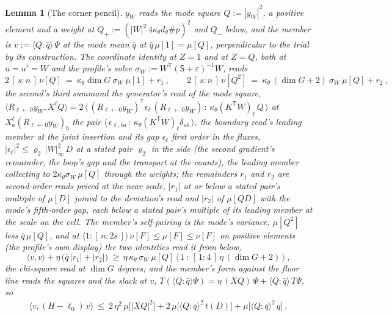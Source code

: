 \documentclass[11pt]{article}
\newtheorem{lemma}{Lemma}
\theoremstyle{definition}
\begin{document}
\begin{lemma}[The corner pencil]
$y_W$ reads the \emph{mode square} $Q:=|y_W|^{2}$, a positive
element and a weight at $Q_+:=(|W|^{2}\,4\kappa_\theta d_\theta\#p)^{2}$
and $Q_-$ below, and the member is
$v:=\langle Q\!:\!\bar q\rangle\,\Psi$ at the \emph{mode mean} $\bar q$ at
$\bar q\,\mu[1]=\mu[Q]$, perpendicular to the trial by its
construction. The coordinate identity at $Z=1$ and at $Z=Q$, both
at $u=u'=W$ and the \emph{profile's solve}
$\sigma_W:=W^{\mathsf T}(\mathsf S+\varepsilon)^{-1}W$, reads
\[
2\,[\,s:n\,]\,\nu[Q]\ =\ \kappa_\theta\dim G\ \sigma_W\ \mu[1]+r_1\ ,
\qquad
2\,[\,s:n\,]\,\nu[Q^{2}]\ =\ \kappa_\theta\,(\dim G+2)\ \sigma_W\ \mu[Q]+r_2\ ,
\]
the second's third summand the generator's read of the mode square,
$\langle R_{\ell\leftarrow0}y_W,X^{\ell}Q\rangle
=2\,\big\langle\,(R_{\ell\leftarrow0}y_W)^{\mathsf T}\epsilon_\ell\,(R_{\ell\leftarrow0}y_W)
\,:\,\kappa_\theta(K^{\mathsf T}W)_\ell\,Q\,\big\rangle$
at $X^{\ell}_a(R_{\ell\leftarrow0}y_W)_b$ the pair
$\langle\,\epsilon_{\ell,ba}\,:\,\kappa_\theta(K^{\mathsf T}W)_\ell\delta_{ab}\,\rangle$,
the boundary read's leading member at the joint insertion and its
gap $\epsilon_\ell$ first order in the fluxes, $|\epsilon_\ell|^{2}
\le\varrho_2\,|W|_\infty^{2}\,D$ at a stated pair $\varrho_2$ in the
side (the second gradient's remainder, the loop's gap and the
transport at the counts), the leading member collecting to
$2\kappa_\theta\sigma_W\,\mu[Q]$ through the weights; the remainders
$r_1$ and $r_2$ are second-order reads priced at the near scale,
$|r_1|$ at or below a stated pair's multiple of $\mu[D]$ joined to
the deviation's read and $|r_2|$ of $\mu[QD]$ with the mode's
fifth-order gap, each below a stated pair's multiple of its
leading member at the scale on the cell. The member's self-pairing
is the mode's variance, $\mu[Q^{2}]$ less $\bar q\,\mu[Q]$, and at
$\langle1\!:\![\,n:2s\,]\rangle\,\nu[F]\le\mu[F]\le\nu[F]$ on positive
elements (the profile's own display) the two identities read it
from below,
\[
\langle v,v\rangle+\eta\,\big(\bar q\,|r_1|+|r_2|\big)\ \ge\
\eta\,\kappa_\theta\,\sigma_W\,\mu[Q]\,
\big\langle\,1\,:\,[\,1:4\,]\,\eta\,(\dim G+2)\,\big\rangle\ ,
\]
the chi-square read at $\dim G$ degrees; and the member's form
against the floor line reads the squares and the slack at $v$,
$T(\langle Q\!:\!\bar q\rangle\Psi)=\eta\,(XQ)\,\Psi+\langle Q\!:\!\bar q\rangle\,T\Psi$, so
\begin{gather*}
\langle v,(H-\ell_0)\,v\rangle\ \le\
2\,\eta^{2}\,\mu\big[|XQ|^{2}\big]+2\,\mu\big[\langle Q\!:\!\bar q\rangle^{2}\,t(D)\big]
+\mu\big[\langle Q\!:\!\bar q\rangle^{2}\,q\big]\ ,\\

\end{gather*}
\end{lemma}
\end{document}
